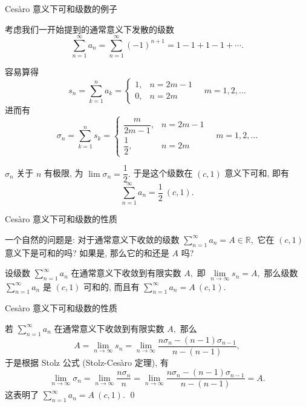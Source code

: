 
\begin{frame}{Cesàro 意义下可和级数的例子}

考虑我们一开始提到的通常意义下发散的级数
\[\sum\limits_{n=1}^{\infty} a_n = \sum\limits_{n=1}^{\infty} (-1)^{n+1}  = 1 - 1 + 1 - 1 + \cdots.\]

\pause

容易算得
\[
s_n = \sum\limits_{k=1}^{n} a_k = \begin{cases}
1, & n = 2m - 1 \\
0, & n = 2m
\end{cases} \quad m = 1, 2, \dots
\]
进而有
\[
\sigma_n = \sum\limits_{k=1}^n s_k = \begin{cases}
\dfrac{m}{2m - 1}, & n = 2m - 1\\
\dfrac{1}{2}, & n = 2m
\end{cases} \quad m = 1, 2, \dots
\]

\pause

$\sigma_n$ 关于 $n$ 有极限, 为 $\lim\limits \sigma_n = \dfrac{1}{2}.$ 于是这个级数在 $(c, 1)$ 意义下可和, 即有
\[\sum\limits_{n=1}^{\infty} a_n = \dfrac{1}{2}~(c, 1).\]

\end{frame}


\begin{frame}{Cesàro 意义下可和级数的性质}

一个自然的问题是: 对于通常意义下收敛的级数 $\sum\limits_{n=1}^{\infty} a_n = A \in \mathbb{R},$ 它在 $(c, 1)$ 意义下是可和的吗? 如果是, 那么它的和还是 $A$ 吗?

\pause
\vspace*{2em}

\begin{prop}
设级数 $\sum\limits_{n=1}^{\infty} a_n$ 在通常意义下收敛到有限实数 $A,$ 即 $\lim\limits_{n \to \infty} s_n = A,$ 那么级数 $\sum\limits_{n=1}^{\infty} a_n$ 是 $(c, 1)$ 可和的, 而且有 $\sum\limits_{n=1}^{\infty} a_n = A~(c, 1).$
\end{prop}

\end{frame}


\begin{frame}{Cesàro 意义下可和级数的性质}

\startproof[bg=yellow, fg=red]
若 $\sum\limits_{n=1}^{\infty} a_n$ 在通常意义下收敛到有限实数 $A,$ 那么
\[A = \lim\limits_{n \to \infty} s_n = \lim\limits_{n \to \infty} \dfrac{n\sigma_n - (n-1)\sigma_{n-1}}{n - (n-1)}, \]
于是根据 Stolz 公式 (Stolz-Cesàro 定理), 有
\[\lim\limits_{n \to \infty} \sigma_n = \lim\limits_{n \to \infty} \dfrac{n\sigma_n}{n} = \lim\limits_{n \to \infty} \dfrac{n\sigma_n - (n-1)\sigma_{n-1}}{n - (n-1)} = A.\]
这表明了 $\sum\limits_{n=1}^{\infty} a_n = A~(c, 1).$
\qed

\end{frame}

